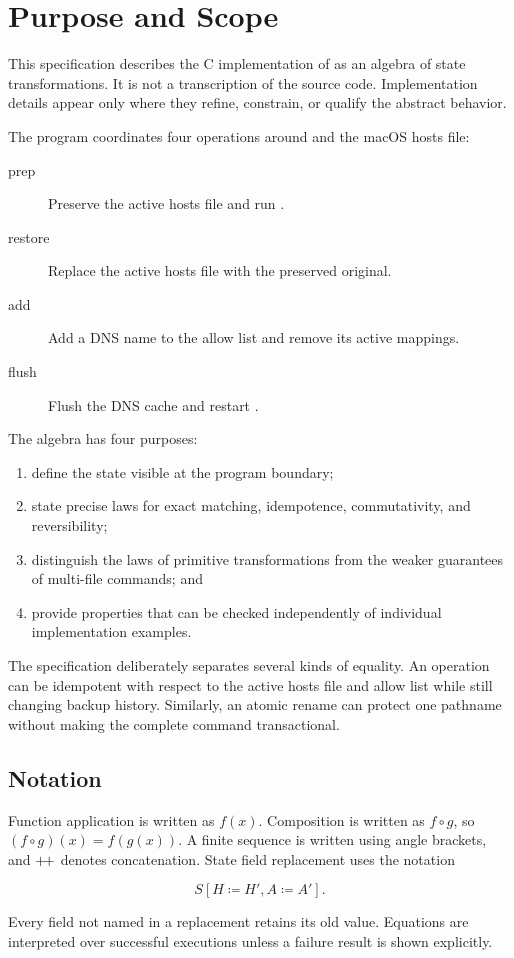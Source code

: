 \section{Purpose and Scope}

This specification describes the C implementation of  as
an algebra of state transformations.  It is not a transcription of the source
code.  Implementation details appear only where they refine, constrain, or
qualify the abstract behavior.

The program coordinates four operations around  and the macOS
hosts file:

\begin{description}
  \item[prep] Preserve the active hosts file and run .
  \item[restore] Replace the active hosts file with the preserved original.
  \item[add] Add a DNS name to the allow list and remove its active mappings.
  \item[flush] Flush the DNS cache and restart .
\end{description}

The algebra has four purposes:

\begin{enumerate}
  \item define the state visible at the program boundary;
  \item state precise laws for exact matching, idempotence, commutativity, and
        reversibility;
  \item distinguish the laws of primitive transformations from the weaker
        guarantees of multi-file commands; and
  \item provide properties that can be checked independently of individual
        implementation examples.
\end{enumerate}

The specification deliberately separates several kinds of equality.  An
operation can be idempotent with respect to the active hosts file and allow
list while still changing backup history.  Similarly, an atomic rename can
protect one pathname without making the complete command transactional.

\subsection{Notation}

Function application is written as $f(x)$.  Composition is written as
$f \circ g$, so $(f \circ g)(x)=f(g(x))$.  A finite sequence is written using
angle brackets, and $\mathbin{+\!+}$ denotes concatenation.  State field replacement
uses the notation

\[
  S[H \coloneqq H', A \coloneqq A'].
\]

Every field not named in a replacement retains its old value.  Equations are
interpreted over successful executions unless a failure result is shown
explicitly.
